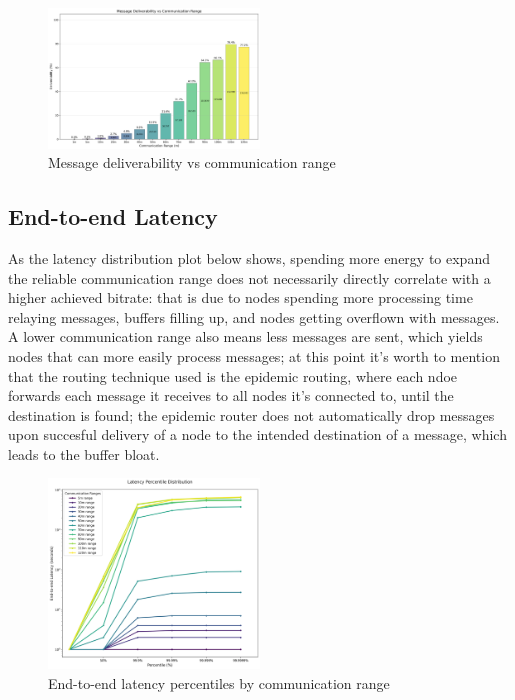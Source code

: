 \begin{figure}
    \centering
    \includegraphics[width=0.5\textwidth]{plots/deliverability_vs_communication_range.png}
    \caption{Message deliverability vs communication range}
    \label{fig:deliverability-vs-communication-range}
\end{figure}

\subsection{End-to-end Latency}
As the latency distribution plot below shows, spending more energy to expand the reliable communication range does not necessarily directly correlate with a higher achieved bitrate: that is due to nodes spending more processing time relaying messages, buffers filling up, and nodes getting overflown with messages. A lower communication range also means less messages are sent, which yields nodes that can more easily process messages; at this point it's worth to mention that the routing technique used is the epidemic routing, where each ndoe forwards each message it receives to all nodes it's connected to, until the destination is found; the epidemic router does not automatically drop messages upon succesful delivery of a node to the intended destination of a message, which leads to the buffer bloat. 

\begin{figure}
    \centering
    \includegraphics[width=0.5\textwidth]{plots/latency_percentiles.png}
    \caption{End-to-end latency percentiles by communication range}
    \label{fig:latency-percentiles}
\end{figure}

